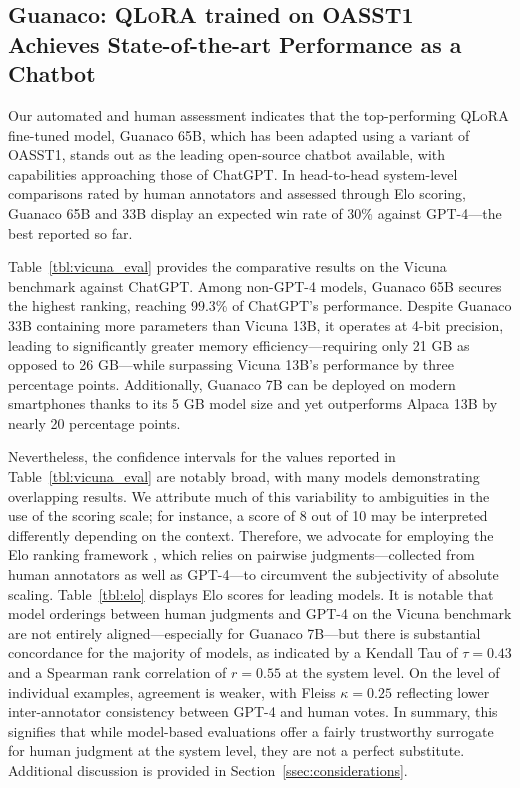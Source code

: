 \subsection{\textbf{Guanaco}: \textsc{QLoRA} trained on OASST1 Achieves State-of-the-art Performance as a Chatbot}

Our automated and human assessment indicates that the top-performing \textsc{QLoRA} fine-tuned model, {Guanaco} 65B, which has been adapted using a variant of OASST1, stands out as the leading open-source chatbot available, with capabilities approaching those of ChatGPT. In head-to-head system-level comparisons rated by human annotators and assessed through Elo scoring, {Guanaco} 65B and 33B display an expected win rate of 30\% against GPT-4—the best reported so far.

Table~\ref{tbl:vicuna_eval} provides the comparative results on the Vicuna benchmark \cite{vicuna2023} against ChatGPT. Among non-GPT-4 models, {Guanaco} 65B secures the highest ranking, reaching 99.3\% of ChatGPT’s performance. Despite {Guanaco} 33B containing more parameters than Vicuna 13B, it operates at 4-bit precision, leading to significantly greater memory efficiency—requiring only 21 GB as opposed to 26 GB—while surpassing Vicuna 13B’s performance by three percentage points. Additionally, {Guanaco} 7B can be deployed on modern smartphones thanks to its 5 GB model size and yet outperforms Alpaca 13B by nearly 20 percentage points.

Nevertheless, the confidence intervals for the values reported in Table~\ref{tbl:vicuna_eval} are notably broad, with many models demonstrating overlapping results. We attribute much of this variability to ambiguities in the use of the scoring scale; for instance, a score of 8 out of 10 may be interpreted differently depending on the context. Therefore, we advocate for employing the Elo ranking framework \citep{elo1967proposed}, which relies on pairwise judgments—collected from human annotators as well as GPT-4—to circumvent the subjectivity of absolute scaling. Table~\ref{tbl:elo} displays Elo scores for leading models. It is notable that model orderings between human judgments and GPT-4 on the Vicuna benchmark are not entirely aligned—especially for Guanaco 7B—but there is substantial concordance for the majority of models, as indicated by a Kendall Tau of $\tau=0.43$ and a Spearman rank correlation of $r=0.55$ at the system level. On the level of individual examples, agreement is weaker, with Fleiss $\kappa=0.25$ reflecting lower inter-annotator consistency between GPT-4 and human votes. In summary, this signifies that while model-based evaluations offer a fairly trustworthy surrogate for human judgment at the system level, they are not a perfect substitute. Additional discussion is provided in Section~\ref{ssec:considerations}.


